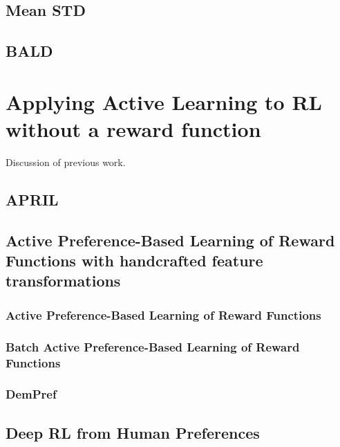 \documentclass[11pt, a4paper, bibliography=totoc]{report}
\begin{document}
\subsection{Mean STD}

\subsection{BALD}

\section{Applying Active Learning to RL without a reward function}
Discussion of previous work.

\subsection{APRIL}

\subsection{Active Preference-Based Learning of Reward Functions with handcrafted feature transformations}

\subsubsection{Active Preference-Based Learning of Reward Functions}

\subsubsection{Batch Active Preference-Based Learning of Reward Functions}

\subsubsection{DemPref}

\subsection{Deep RL from Human Preferences}
\end{document}
